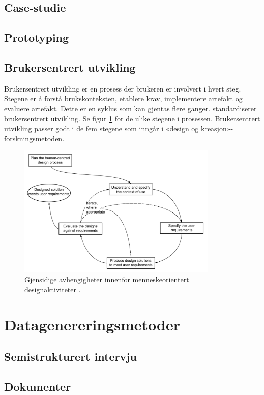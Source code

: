 \subsection{Case-studie}
    
\subsection{Prototyping}

\subsection{Brukersentrert utvikling}
Brukersentrert utvikling er en prosess der brukeren er involvert i hvert steg.
Stegene er å forstå brukskonteksten, etablere krav, implementere artefakt og evaluere artefakt. Dette er en syklus som kan gjentas flere ganger.
\citet{dis20099241} standardiserer brukersentrert utvikling. Se figur \ref{fig:iso9241-210}
for de ulike stegene i prosessen.
Brukersentrert utvikling passer godt i de fem stegene som inngår i «design og kreasjon»-forskningsmetoden.

\begin{figure}
\centering
\includegraphics[width=0.85\textwidth]{fig/iso9241-210}
\caption{Gjensidige avhengigheter innenfor menneskeorientert designaktiviteter \citep{dis20099241}.}
\label{fig:iso9241-210}
\end{figure}

\section{Datagenereringsmetoder}

\subsection{Semistrukturert intervju}

\subsection{Dokumenter}